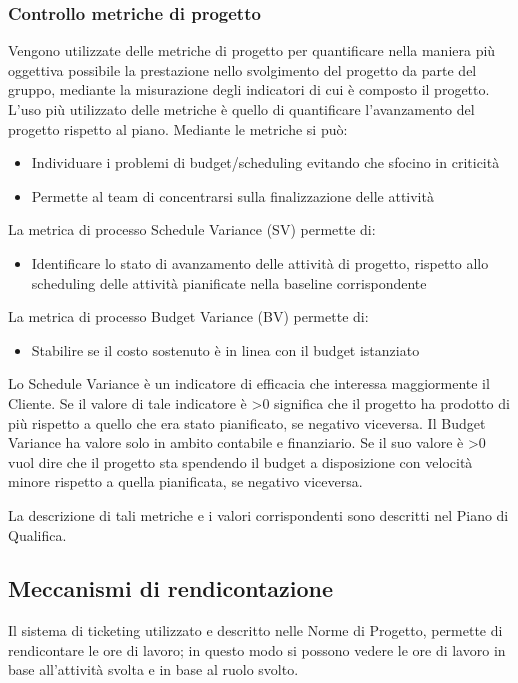 \subsubsection{Controllo metriche di progetto}
Vengono utilizzate delle metriche di progetto per quantificare nella maniera più oggettiva possibile la prestazione nello svolgimento del progetto da parte del gruppo, mediante la misurazione degli indicatori di cui è composto il progetto. L'uso più utilizzato delle metriche è quello di quantificare l'avanzamento del progetto rispetto al piano. Mediante le metriche si può:
\begin{itemize}
\item Individuare i problemi di budget/scheduling evitando che sfocino in criticità
\item Permette al team di concentrarsi sulla finalizzazione delle attività
\end{itemize} 
La metrica di processo Schedule Variance (SV) permette di:
\begin{itemize}
\item Identificare lo stato di avanzamento delle attività di progetto,  rispetto allo scheduling delle attività pianificate nella baseline corrispondente
\end{itemize}
La metrica di processo Budget Variance (BV) permette di:
\begin{itemize}
\item Stabilire se il costo sostenuto è in linea con il budget istanziato
\end{itemize}
Lo Schedule Variance è un indicatore di efficacia che interessa maggiormente il Cliente. Se il valore di tale indicatore è >0 significa che il progetto ha prodotto di più rispetto a quello che era stato pianificato, se negativo viceversa.
Il Budget Variance ha valore solo in ambito contabile e finanziario. Se il suo valore è >0 vuol dire che il progetto sta spendendo il budget a disposizione con velocità minore rispetto a quella pianificata, se negativo viceversa.
 
La descrizione di tali metriche e i valori corrispondenti sono descritti nel Piano di Qualifica.
\subsection{Meccanismi di rendicontazione}
Il sistema di ticketing utilizzato e descritto nelle Norme di Progetto, permette di rendicontare le ore di lavoro; in questo modo  si possono vedere le ore di lavoro in base all'attività svolta e in base al ruolo svolto.

